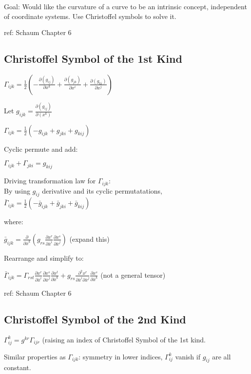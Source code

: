 \documentclass[8pt,letter]{article}
\begin{document}
\begin{multicols*}{2}
  Goal: Would like the curvature of a curve to be an intrinsic concept, independent of coordinate systems. Use Christoffel symbols to solve it.

  ref: Schaum Chapter 6
  
  \subsection{Christoffel Symbol of the 1st Kind}

  $\Gamma_{ijk} = \frac{1}{2}\left( - \frac{\partial (g_{ij})}{\partial x^k} + \frac{\partial (g_{jk})}{\partial x^i} + \frac{\partial (g_{ki})}{\partial x^j} \right)$

  Let $g_{ijk}=\frac{\partial(g_{ij})}{\partial(x^k)}$

  $\Gamma_{ijk} = \frac{1}{2}( -g_{ijk} + g_{jki} + g_{kij})$

  Cyclic permute and add:

  $\Gamma_{ijk} + \Gamma_{jki} = g_{kij}$

  Driving transformation law for $\Gamma_{ijk}$:\\
  By using $g_{ij}$ derivative and its cyclic permutatations,\\
  $\bar{\Gamma}_{ijk} = \frac{1}{2}( -\bar{g}_{ijk} + \bar{g}_{jki} + \bar{g}_{kij})$

  where:
  
  $\bar{g}_{ijk} = \frac{\partial}{\partial \bar{x}^k} \left(g_{rs} \frac{\partial x^r}{\partial \bar{x}^i} \frac{\partial x^s}{\partial \bar{x}^j}\right)$ (expand this)

  Rearrange and simplify to:

  $\bar{\Gamma}_{ijk} = \Gamma_{rst} \frac{\partial x^r}{\partial \bar{x}^i} \frac{\partial x^s}{\partial \bar{x}^j} \frac{\partial x^t}{\partial \bar{x}^k} + g_{rs} \frac{\partial^2 x^r}{\partial \bar{x}^i \partial \bar{x}^j} \frac{\partial x^s}{\partial \bar{x}^k}$ (not a general tensor)

  ref: Schaum Chapter 6
  
  \subsection{Christoffel Symbol of the 2nd Kind}

  $\Gamma_{ij}^k = g^{kr} \Gamma_{ijr}$ (raising an index of Christoffel Symbol of the 1st kind.

  Similar properties as $\Gamma_{ijk}$: symmetry in lower indices, $\Gamma_{ij}^k$ vanish if $g_{ij}$ are all constant.
  

\end{multicols*}
\end{document}
